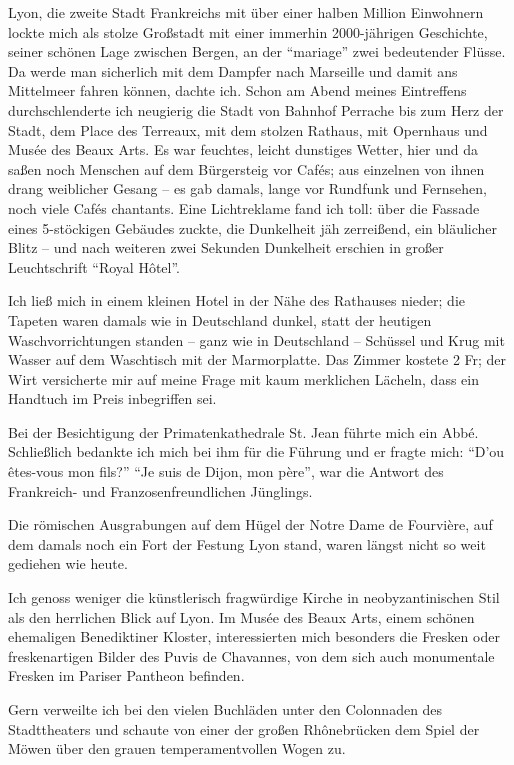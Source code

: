 \documentclass[a5paper,pagesize,10pt,twoside=true]{scrbook}
\begin{document}
Lyon, die zweite Stadt Frankreichs mit über einer halben Million Einwohnern lockte mich als stolze Großstadt mit einer immerhin \num{2000}-jährigen Geschichte, seiner schönen Lage zwischen Bergen, an der \enquote{mariage} zwei bedeutender Flüsse. Da werde man sicherlich mit dem Dampfer nach Marseille und damit ans Mittelmeer fahren können, dachte ich. Schon am Abend meines Eintreffens durchschlenderte ich neugierig die Stadt von Bahnhof Perrache bis zum Herz der Stadt, dem Place des Terreaux, mit dem stolzen Rathaus, mit Opernhaus und Musée des Beaux Arts. Es war feuchtes, leicht dunstiges Wetter, hier und da saßen noch Menschen auf dem Bürgersteig vor Cafés; aus einzelnen von ihnen drang weiblicher Gesang -- es gab damals, lange vor Rundfunk und Fernsehen, noch viele Cafés chantants. Eine Lichtreklame fand ich toll: über die Fassade eines 5-stöckigen Gebäudes zuckte, die Dunkelheit jäh zerreißend, ein bläulicher Blitz -- und nach weiteren zwei Sekunden Dunkelheit erschien in großer Leuchtschrift \enquote{Royal Hôtel}.

Ich ließ mich in einem kleinen Hotel in der Nähe des Rathauses nieder; die Tapeten waren damals wie in Deutschland dunkel, statt der heutigen Waschvorrichtungen standen -- ganz wie in Deutschland -- Schüssel und Krug mit Wasser auf dem Waschtisch mit der Marmorplatte. Das Zimmer kostete 2 Fr; der Wirt versicherte mir auf meine Frage mit kaum merklichen Lächeln, dass ein Handtuch im Preis inbegriffen sei.

Bei der Besichtigung der Primatenkathedrale St. Jean führte mich ein Abbé. Schließlich bedankte ich mich bei ihm für die Führung und er fragte mich: \enquote{D'ou êtes-vous mon fils?} \enquote{Je suis de Dijon, mon père}, war die Antwort des Frankreich- und Franzosenfreundlichen Jünglings.

Die römischen Ausgrabungen auf dem Hügel der Notre Dame de Fourvière, auf dem damals noch ein Fort der Festung Lyon stand, waren längst nicht so weit gediehen wie heute.

Ich genoss weniger die künstlerisch fragwürdige Kirche in neobyzantinischen Stil als den herrlichen Blick auf Lyon. Im Musée des Beaux Arts, einem schönen ehemaligen Benediktiner Kloster, interessierten mich besonders die Fresken oder freskenartigen Bilder des Puvis de Chavannes, von dem sich auch monumentale Fresken im Pariser Pantheon befinden.

Gern verweilte ich bei den vielen Buchläden unter den Colonnaden des Stadttheaters und schaute von einer der großen Rhônebrücken dem Spiel der Möwen über den grauen temperamentvollen Wogen zu.
\end{document}
